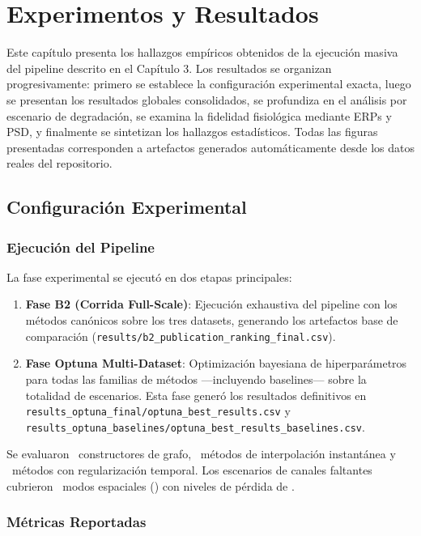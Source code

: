 \chapter{Experimentos y Resultados}

Este capítulo presenta los hallazgos empíricos obtenidos de la ejecución masiva del pipeline descrito en el Capítulo 3. Los resultados se organizan progresivamente: primero se establece la configuración experimental exacta, luego se presentan los resultados globales consolidados, se profundiza en el análisis por escenario de degradación, se examina la fidelidad fisiológica mediante ERPs y PSD, y finalmente se sintetizan los hallazgos estadísticos. Todas las figuras presentadas corresponden a artefactos generados automáticamente desde los datos reales del repositorio.

\section{Configuración Experimental}

\subsection{Ejecución del Pipeline}

La fase experimental se ejecutó en dos etapas principales:
\begin{enumerate}
    \item \textbf{Fase B2 (Corrida Full-Scale)}: Ejecución exhaustiva del pipeline con los métodos canónicos sobre los tres datasets, generando los artefactos base de comparación (\texttt{results/b2\_publication\_ranking\_final.csv}).
    \item \textbf{Fase Optuna Multi-Dataset}: Optimización bayesiana de hiperparámetros para todas las familias de métodos ---incluyendo baselines--- sobre la totalidad de escenarios. Esta fase generó los resultados definitivos en \texttt{results\_optuna\_final/optuna\_best\_results.csv} y \texttt{results\_optuna\_baselines/optuna\_best\_results\_baselines.csv}.
\end{enumerate}

Se evaluaron \ResNGraphMethods~constructores de grafo, \ResNInstantMethods~métodos de interpolación instantánea y \ResNTVMethods~métodos con regularización temporal. Los escenarios de canales faltantes cubrieron \ResNScenarios~modos espaciales (\ResScenariosNames) con niveles de pérdida de \ResMissingLevels.

\subsection{Métricas Reportadas}

